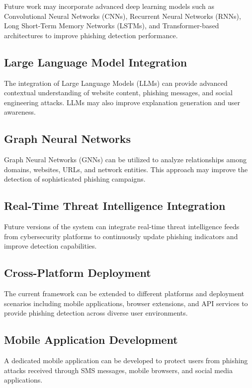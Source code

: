 \documentclass[12pt]{report}
\begin{document}
Future work may incorporate advanced deep learning models such as Convolutional Neural Networks (CNNs), Recurrent Neural Networks (RNNs), Long Short-Term Memory Networks (LSTMs), and Transformer-based architectures to improve phishing detection performance.

\subsection{Large Language Model Integration}

The integration of Large Language Models (LLMs) can provide advanced contextual understanding of website content, phishing messages, and social engineering attacks. LLMs may also improve explanation generation and user awareness.

\subsection{Graph Neural Networks}

Graph Neural Networks (GNNs) can be utilized to analyze relationships among domains, websites, URLs, and network entities. This approach may improve the detection of sophisticated phishing campaigns.

\subsection{Real-Time Threat Intelligence Integration}

Future versions of the system can integrate real-time threat intelligence feeds from cybersecurity platforms to continuously update phishing indicators and improve detection capabilities.

\subsection{Cross-Platform Deployment}

The current framework can be extended to different platforms and deployment scenarios including mobile applications, browser extensions, and API services to provide phishing detection across diverse user environments.

\subsection{Mobile Application Development}

A dedicated mobile application can be developed to protect users from phishing attacks received through SMS messages, mobile browsers, and social media applications.
\end{document}
